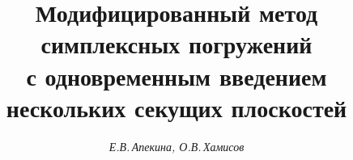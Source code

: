 








\newcommand{\A}{{\cal A}}


\newcommand{\col}{\operatorname{col}}


\newcommand{\tts}[1]{}













\setcounter{page}{16}












\author{\it Е.В.\,Апекина, О.В.\,Хамисов}


\title{Модифицированный метод симплексных погружений\\


с одновременным введением нескольких секущих плоскостей}





\date{}







\pagestyle{plain} %













